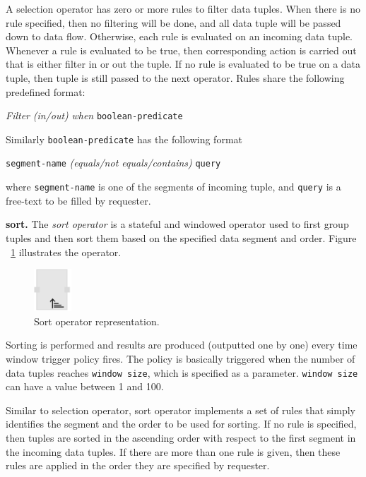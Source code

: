A selection operator has zero or more rules to filter data tuples. When there is 
no rule specified, then no filtering will be done, and all data tuple will be passed 
down to data flow. Otherwise, each rule is evaluated on an incoming data tuple. 
Whenever a rule is evaluated to be true, then corresponding action is carried out 
that is either filter in or out the tuple. If no rule is evaluated to be true on a data tuple, 
then tuple is still passed to the next operator. Rules share the following predefined 
format:

\textit{Filter} \textit{(in/out)} \textit{when} \texttt{boolean-predicate}

Similarly \texttt{boolean-predicate} has the following format

\texttt{segment-name} \textit{(equals/not equals/contains)} \texttt{query}

where \texttt{segment-name} is one of the segments of incoming tuple, 
and \texttt{query} is a free-text to be filled by requester.

\textbf{sort.}
The \textit{sort operator} is a stateful and windowed operator used to first group 
tuples and then sort them based on the specified data segment and order. Figure
~\ref{fig:sort operator} illustrates the operator.

\begin{figure}[ht]
	\centering
	\includegraphics[height=60px]{figures/SortOperator.pdf}
	\caption{Sort operator representation.}
	\label{fig:sort operator}
\end{figure}

Sorting is performed and results are produced (outputted one by one) every time 
window trigger policy fires. The policy is basically triggered when the number of 
data tuples reaches \texttt{window size}, which is specified as a parameter. 
\texttt{window size} can have a value between 1 and 100.

Similar to selection operator, sort operator implements a set of rules that simply 
identifies the segment and the order to be used for sorting. If no rule is specified, 
then tuples are sorted in the ascending order with respect to the first segment in 
the incoming data tuples. If there are more than one rule is given, then these rules 
are applied in the order they are specified by requester.


